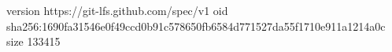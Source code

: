 version https://git-lfs.github.com/spec/v1
oid sha256:1690fa31546e0f49ccd0b91c578650fb6584d771527da55f1710e911a1214a0c
size 133415
